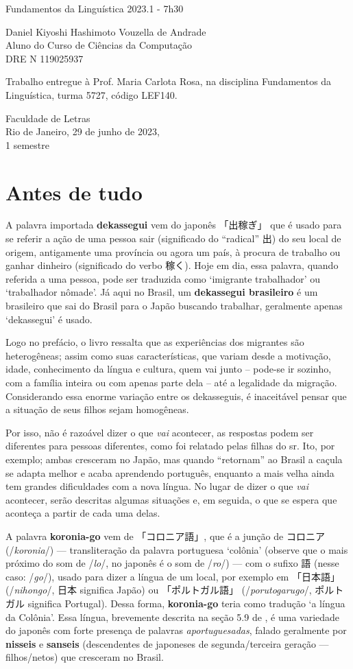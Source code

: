 \documentclass{article}
\date{}
\newcommand{\jap}[1]{#1}
\newcommand{\jquote}[1]{「#1」}
\newcommand{\keyword}[1]{\textbf{#1}}
\newcommand{\phone}[1]{\slash\textit{#1}\slash}
\newcommand{\dekassegui}{\jap{出稼ぎ}}
\newcommand{\koroniago}{\jap{コロニア語}}
\newcommand{\koronia}{\keyword{koronia-go}}
\newcommand{\dre}{119025937}
\newcommand{\hashi}{Daniel Kiyoshi Hashimoto Vouzella de Andrade}
\newcommand{\mytitle}{Fundamentos da Linguística 2023.1 - 7h30}
\newcommand{\myauthor}{\hashi{} \\
    Aluno do Curso de Ciências da Computação \\
    DRE N\textdegree{} \dre{}
}
\newcommand{\makecapa}{
    \newpage
    \hfill\par\vfill

    \begin{center}
        \huge
        \mytitle{}
    \end{center}

    \vfill

    \begin{center}
        \Large
        \myauthor{}
    \end{center}

    \vfill
    \vfill
    \begin{multicols}{3}
        \par\hfill \columnbreak

        \par\hfill \columnbreak

        Trabalho entregue à
        Prof. Maria Carlota Rosa,
        na disciplina
        Fundamentos da Linguística,
        turma 5727,
        código LEF140.
    \end{multicols}

    \vfill

    \begin{center}
        Faculdade de Letras \\
        Rio de Janeiro, 29 de junho de 2023, \\
        1\textdegree{} semestre
    \end{center}

    \pagenumbering{gobble}
    \newpage
    \pagenumbering{arabic}
}
\begin{document}
\makecapa

\setcounter{section}{-1}
\section{Antes de tudo}

A palavra importada \keyword{dekassegui}
vem do japonês \jquote{\dekassegui{}}
que é usado para se referir a ação de uma pessoa
sair (significado do ``radical'' 出)
do seu local de origem,
antigamente uma província ou agora um país,
à procura de trabalho ou ganhar dinheiro
(significado do verbo 稼く).
Hoje em dia, essa palavra, quando referida a uma pessoa,
pode ser traduzida
como `imigrante trabalhador' ou `trabalhador nômade'.
Já aqui no Brasil, um \keyword{dekassegui brasileiro}
é um brasileiro que sai do Brasil para o Japão
buscando trabalhar,
geralmente apenas `dekassegui' é usado.

Logo no prefácio, o livro \cite{filhosdekasegi}
ressalta que as experiências dos migrantes são heterogêneas;
assim como suas características, que variam desde
a motivação, idade, conhecimento da língua e cultura,
quem vai junto
-- pode-se ir sozinho, com a família inteira ou
com apenas parte dela --
até a legalidade da migração.
Considerando essa enorme variação entre os dekasseguis,
é inaceitável pensar que a situação de seus filhos
sejam homogêneas.

Por isso, não é razoável dizer
o que \emph{vai} acontecer,
as respostas podem ser diferentes para pessoas diferentes,
como foi relatado pelas filhas do sr. Ito, por exemplo;
ambas cresceram no Japão,
mas quando ``retornam'' ao Brasil
a caçula se adapta melhor e acaba aprendendo português,
enquanto a mais velha ainda tem grandes dificuldades
com a nova língua.
No lugar de dizer o que \emph{vai} acontecer,
serão descritas algumas situações
e, em seguida,
o que se espera que aconteça
a partir de cada uma delas.

A palavra \koronia{} vem de \jquote{\koroniago{}},
que é a junção de コロニア (\phone{koronia})
--- transliteração da palavra portuguesa `colônia'
(observe que o mais próximo do som de \phone{lo},
no japonês é o som de \phone{ro}) ---
com o sufixo 語 (nesse caso: \phone{go}),
usado para dizer a língua de um local,
por exemplo em \jquote{日本語}
(\phone{nihongo}, 日本 significa Japão)
ou \jquote{ポルトガル語}
(\phone{porutogarugo}, ポルトガル significa Portugal).
Dessa forma, \koronia{} teria como tradução
`a língua da Colônia'\footnotemark{}.
Essa língua, brevemente descrita
na seção 5.9 de \cite{viagemling},
é uma variedade do japonês
com forte presença de palavras \emph{aportuguesadas},
falado geralmente por
\keyword{nisseis} e \keyword{sanseis}
(descendentes de japoneses de segunda/terceira geração ---
filhos/netos)
que cresceram no Brasil.
\end{document}
